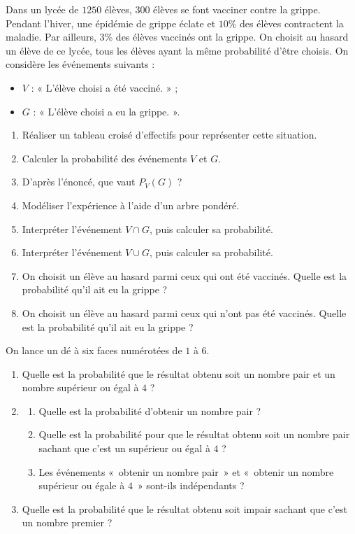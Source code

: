 \documentclass[11pt]{article}
\begin{document}
\begin{exo}
  Dans un lycée de $1250$ élèves, $300$ élèves se font vacciner contre la
  grippe. Pendant l'hiver, une épidémie de grippe éclate et $10$\% des élèves
  contractent la maladie. Par ailleurs, $3$\% des élèves vaccinés ont la grippe.
  On choisit au hasard un élève de ce lycée, tous les élèves ayant la même
  probabilité d'être choisis. On considère les événements suivants :
  \begin{itemize}
    \item $V$ : « L'élève choisi a été vacciné. » ;
    \item $G$ : « L'élève choisi a eu la grippe. ».
  \end{itemize}
  \begin{enumerate}
    \item Réaliser un tableau croisé d'effectifs pour représenter cette
      situation.
    \item Calculer la probabilité des événements $V$ et $G$.
    \item D'après l'énoncé, que vaut $P_V(G)$ ?
    \item Modéliser l'expérience à l'aide d'un arbre pondéré.
    \item Interpréter l'événement $V\cap G$, puis calculer sa probabilité.
    \item Interpréter l'événement $V\cup G$, puis calculer sa probabilité.
    \item On choisit un élève au hasard parmi ceux qui ont été vaccinés. Quelle
      est la probabilité qu'il ait eu la grippe ?
    \item On choisit un élève au hasard parmi ceux qui n'ont pas été vaccinés.
      Quelle est la probabilité qu'il ait eu la grippe ?
  \end{enumerate}
\end{exo}

\begin{exo}
  On lance un dé à six faces numérotées de $1$ à $6$.
  \begin{enumerate}
    \item Quelle est la probabilité que le résultat obtenu soit un nombre pair
      et un nombre supérieur ou égal à $4$ ?
    \item \begin{enumerate}
          \item Quelle est la probabilité d'obtenir un nombre pair ?
          \item Quelle est la probabilité pour que le résultat obtenu soit un nombre
            pair sachant que c'est un  supérieur ou égal à $4$ ?
          \item Les événements «~obtenir un nombre pair~» et «~obtenir un nombre
            supérieur ou égale à $4$~» sont-ils indépendants ?
      \end{enumerate}
    \item Quelle est la probabilité que le résultat obtenu soit impair sachant
      que c'est un nombre premier ?
  \end{enumerate}
\end{exo}
\end{document}
